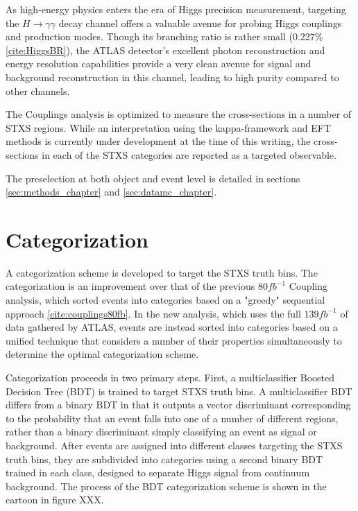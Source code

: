 
As high-energy physics enters the era of Higgs precision measurement, targeting the $H \rightarrow \gamma \gamma$ decay channel offers a valuable avenue for probing Higgs couplings and production modes. Though its branching ratio is rather small (0.227\% \ref{cite:HiggsBR}), the ATLAS detector's excellent photon reconstruction and energy resolution capabilities provide a very clean avenue for signal and background reconstruction in this channel, leading to high purity compared to other channels.

The Couplings analysis is optimized to measure the cross-sections in a number of STXS regions. While an interpretation using the kappa-framework and EFT methods is currently under development at the time of this writing, the cross-sections in each of the STXS categories are reported as a targeted observable.

The preselection at both object and event level is detailed in sections \ref{sec:methods_chapter} and \ref{sec:datamc_chapter}.

\section{Categorization} \label{sec:Categorization} 

A categorization scheme is developed to target the STXS truth bins. The categorization is an improvement over that of the previous $80 fb^{-1}$ Coupling analysis, which sorted events into categories based on a "greedy" sequential approach \ref{cite:couplings80fb}. In the new analysis, which uses the full $139 fb^{-1}$ of data gathered by ATLAS, events are instead sorted into categories based on a unified technique that considers a number of their properties simultaneously to determine the optimal categorization scheme.

Categorization proceeds in two primary steps. First, a multiclassifier Boosted Decision Tree (BDT) is trained to target STXS truth bins. A multiclassifier BDT differs from a binary BDT in that it outputs a vector discriminant corresponding to the probability that an event falls into one of a number of different regions, rather than a binary discriminant simply classifying an event as signal or background. After events are assigned into different classes targeting the STXS truth bins, they are subdivided into categories using a second binary BDT trained in each class, designed to separate Higgs signal from continuum background. The process of the BDT categorization scheme is shown in the cartoon in figure XXX.

